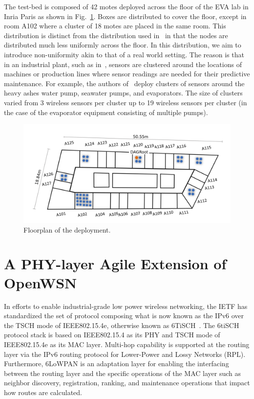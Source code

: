 \documentclass[journal]{IEEEtran}
\begin{document}

The test-bed is composed of 42 motes deployed across the floor of the EVA lab in Inria Paris as shown in Fig.~\ref{fig:building_motes}.
Boxes are distributed to cover the floor, except in room A102 where a cluster of 18 motes are placed in the same room.
This distribution is distinct from the distribution used in~\cite{brachmann19ieee} in that the nodes are distributed much less uniformly across the floor. 
In this distribution, we aim to introduce non-uniformity akin to that of a real world setting.
The reason is that in an industrial plant, such as in~\cite{civerchia17industrial}, sensors are clustered around the locations of machines or production lines where sensor readings are needed for their predictive maintenance.
For example, the authors of~\cite{civerchia17industrial} deploy clusters of sensors around the heavy ashes water pump, seawater pumps, and evaporators. 
The size of clusters varied from 3 wireless sensors per cluster up to 19 wireless sensors per cluster (in the case of the evaporator equipment consisting of multiple pumps). 

\begin{figure}
	\centering
	\includegraphics[width=1\columnwidth]{building_motes}
	\caption{Floorplan of the deployment.}
    \label{fig:building_motes}
\end{figure}

\section{A PHY-layer Agile Extension of OpenWSN}
\label{sec:openwsn}


In efforts to enable industrial-grade low power wireless networking, the IETF has standardized the set of protocol composing what is now known as the IPv6 over the TSCH mode of IEEE802.15.4e, otherwise known as 6TiSCH~\cite{vilajosana21ietf}.
The 6tiSCH protocol stack is based on IEEE802.15.4 as its PHY and TSCH mode of IEEE802.15.4e as its MAC layer.
Multi-hop capability is supported at the routing layer via the IPv6 routing protocol for Lower-Power and Lossy Networks (RPL). 
Furthermore, 6LoWPAN is an adaptation layer for enabling the interfacing between the routing layer and the specific operations of the MAC layer such as neighbor discovery, registration, ranking, and maintenance operations that impact how routes are calculated. 
\end{document}
